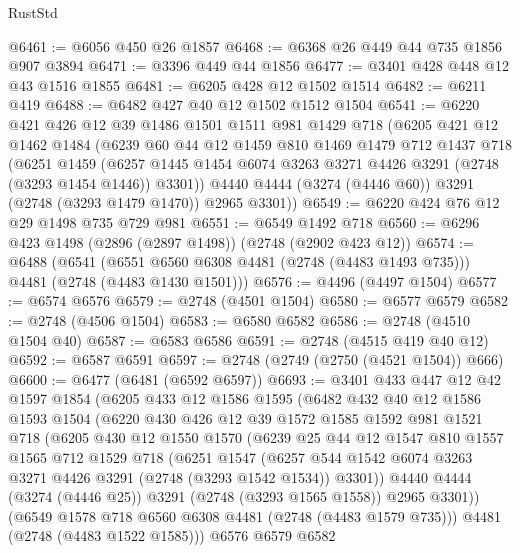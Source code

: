 \begin{lexlean}{RustStd}
\begin{coremodule}
@6461 := @6056 @450 @26 @1857
@6468 := @6368 @26 @449 @44 @735 @1856 @907 @3894
@6471 := @3396 @449 @44 @1856
@6477 := @3401 @428 @448 @12 @43 @1516 @1855
@6481 := @6205 @428 @12 @1502 @1514
@6482 := @6211 @419
@6488 := @6482 @427 @40 @12 @1502 @1512 @1504
@6541 := @6220
    @421
    @426
    @12
    @39
    @1486
    @1501
    @1511
    @981
    @1429
    @718
    (@6205
      @421
      @12
      @1462
      @1484
      (@6239
        @60
        @44
        @12
        @1459
        @810
        @1469
        @1479
        @712
        @1437
        @718
        (@6251
          @1459
          (@6257 @1445 @1454 @6074 @3263 @3271 @4426 @3291 (@2748 (@3293 @1454 @1446)) @3301))
        @4440
        @4444
        (@3274 (@4446 @60))
        @3291
        (@2748 (@3293 @1479 @1470))
        @2965
        @3301))
@6549 := @6220 @424 @76 @12 @29 @1498 @735 @729 @981
@6551 := @6549 @1492 @718
@6560 := @6296 @423 @1498 (@2896 (@2897 @1498)) (@2748 (@2902 @423 @12))
@6574 := @6488
    (@6541 (@6551 @6560 @6308 @4481 (@2748 (@4483 @1493 @735))) @4481 (@2748 (@4483 @1430 @1501)))
@6576 := @4496 (@4497 @1504)
@6577 := @6574 @6576
@6579 := @2748 (@4501 @1504)
@6580 := @6577 @6579
@6582 := @2748 (@4506 @1504)
@6583 := @6580 @6582
@6586 := @2748 (@4510 @1504 @40)
@6587 := @6583 @6586
@6591 := @2748 (@4515 @419 @40 @12)
@6592 := @6587 @6591
@6597 := @2748 (@2749 (@2750 (@4521 @1504)) @666)
@6600 := @6477 (@6481 (@6592 @6597))
@6693 := @3401
    @433
    @447
    @12
    @42
    @1597
    @1854
    (@6205
      @433
      @12
      @1586
      @1595
      (@6482
        @432
        @40
        @12
        @1586
        @1593
        @1504
        (@6220
          @430
          @426
          @12
          @39
          @1572
          @1585
          @1592
          @981
          @1521
          @718
          (@6205
            @430
            @12
            @1550
            @1570
            (@6239
              @25
              @44
              @12
              @1547
              @810
              @1557
              @1565
              @712
              @1529
              @718
              (@6251
                @1547
                (@6257 @544 @1542 @6074 @3263 @3271 @4426 @3291 (@2748 (@3293 @1542 @1534)) @3301))
              @4440
              @4444
              (@3274 (@4446 @25))
              @3291
              (@2748 (@3293 @1565 @1558))
              @2965
              @3301))
          (@6549 @1578 @718 @6560 @6308 @4481 (@2748 (@4483 @1579 @735)))
          @4481
          (@2748 (@4483 @1522 @1585)))
        @6576
        @6579
        @6582

\end{coremodule}
\end{lexlean}
